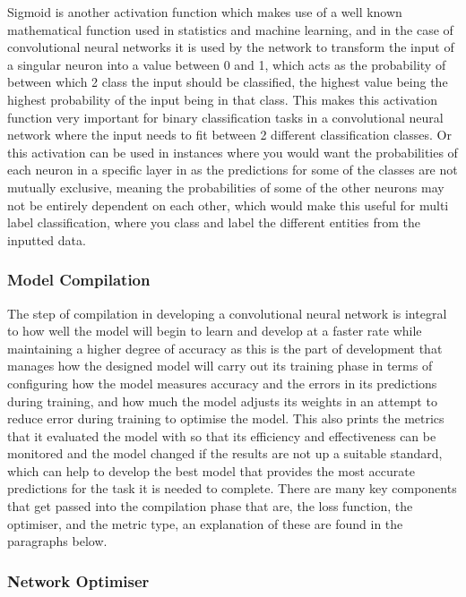 \documentclass[]{final_report}
\begin{document}
Sigmoid is another activation function which makes use of a well known mathematical function used in statistics and machine learning, and in the case of convolutional neural networks it is used by the network to transform the input of a singular neuron into a value between 0 and 1, which acts as the probability of between which 2 class the input should be classified, the highest value being the highest probability of the input being in that class. This makes this activation function very important for binary classification tasks in a convolutional neural network where the input needs to fit between 2 different classification classes. Or this activation can be used in instances where you would want the probabilities of each neuron in a specific layer in as the predictions for some of the classes are not mutually exclusive, meaning the probabilities of some of the other neurons may not be entirely dependent on each other, which would make this useful for multi label classification, where you class and label the different entities from the inputted data. 

\subsubsection{Model Compilation}

The step of compilation in developing a convolutional neural network is integral to how well the model will begin to learn and develop at a faster rate while maintaining a higher degree of accuracy as this is the part of development that manages how the designed model will carry out its training phase in terms of configuring how the model measures accuracy and the errors in its predictions during training, and how much the model adjusts its weights in an attempt to reduce error during training to optimise the model. This also prints the metrics that it evaluated the model with so that its efficiency and effectiveness can be monitored and the model changed if the results are not up a suitable standard, which can help to develop the best model that provides the most accurate predictions for the task it is needed to complete. There are many key components that get passed into the compilation phase that are, the loss function, the optimiser, and the metric type, an explanation of these are found in the paragraphs below. 

\subsubsection{Network Optimiser}
\end{document}
